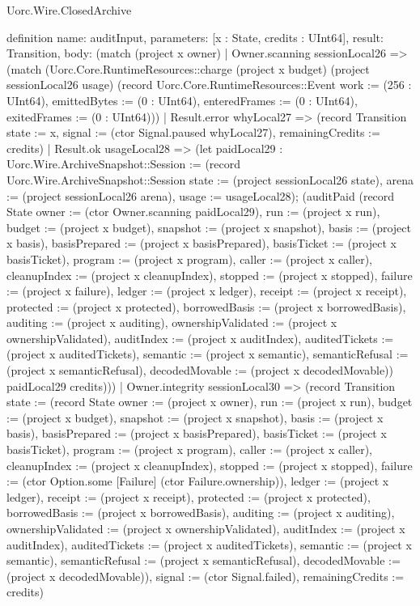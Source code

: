 \begin{lexlean}{Uorc.Wire.ClosedArchive}
\begin{semanticmodule}
definition{
  name: auditInput,
  parameters: [x : State, credits : UInt64],
  result: Transition,
  body: (match (project x owner)
    | Owner.scanning sessionLocal26 => (match (Uorc.Core.RuntimeResources::charge (project x budget) (project sessionLocal26 usage) (record Uorc.Core.RuntimeResources::Event {work := (256 : UInt64), emittedBytes := (0 : UInt64), enteredFrames := (0 : UInt64), exitedFrames := (0 : UInt64)}))
      | Result.error whyLocal27 => (record Transition {state := x, signal := (ctor Signal.paused whyLocal27), remainingCredits := credits})
      | Result.ok usageLocal28 => (let paidLocal29 : Uorc.Wire.ArchiveSnapshot::Session := (record Uorc.Wire.ArchiveSnapshot::Session {state := (project sessionLocal26 state), arena := (project sessionLocal26 arena), usage := usageLocal28}); (auditPaid (record State {owner := (ctor Owner.scanning paidLocal29), run := (project x run), budget := (project x budget), snapshot := (project x snapshot), basis := (project x basis), basisPrepared := (project x basisPrepared), basisTicket := (project x basisTicket), program := (project x program), caller := (project x caller), cleanupIndex := (project x cleanupIndex), stopped := (project x stopped), failure := (project x failure), ledger := (project x ledger), receipt := (project x receipt), protected := (project x protected), borrowedBasis := (project x borrowedBasis), auditing := (project x auditing), ownershipValidated := (project x ownershipValidated), auditIndex := (project x auditIndex), auditedTickets := (project x auditedTickets), semantic := (project x semantic), semanticRefusal := (project x semanticRefusal), decodedMovable := (project x decodedMovable)}) paidLocal29 credits)))
    | Owner.integrity sessionLocal30 => (record Transition {state := (record State {owner := (project x owner), run := (project x run), budget := (project x budget), snapshot := (project x snapshot), basis := (project x basis), basisPrepared := (project x basisPrepared), basisTicket := (project x basisTicket), program := (project x program), caller := (project x caller), cleanupIndex := (project x cleanupIndex), stopped := (project x stopped), failure := (ctor Option.some [Failure] (ctor Failure.ownership)), ledger := (project x ledger), receipt := (project x receipt), protected := (project x protected), borrowedBasis := (project x borrowedBasis), auditing := (project x auditing), ownershipValidated := (project x ownershipValidated), auditIndex := (project x auditIndex), auditedTickets := (project x auditedTickets), semantic := (project x semantic), semanticRefusal := (project x semanticRefusal), decodedMovable := (project x decodedMovable)}), signal := (ctor Signal.failed), remainingCredits := credits})
}
\end{semanticmodule}
\end{lexlean}
